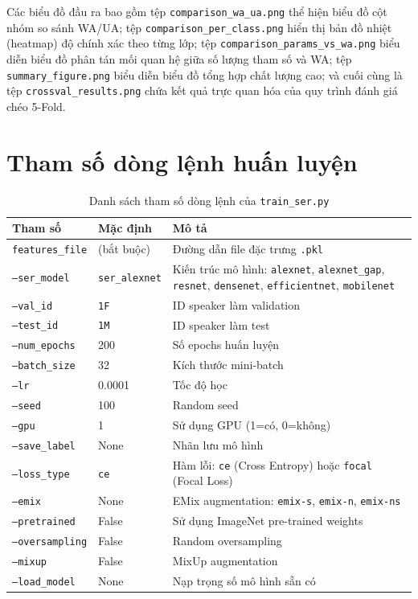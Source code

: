 Các biểu đồ đầu ra bao gồm tệp \texttt{comparison\_wa\_ua.png} thể hiện biểu đồ cột nhóm so sánh WA/UA; tệp \texttt{comparison\_per\_class.png} hiển thị bản đồ nhiệt (heatmap) độ chính xác theo từng lớp; tệp \texttt{comparison\_params\_vs\_wa.png} biểu diễn biểu đồ phân tán mối quan hệ giữa số lượng tham số và WA; tệp \texttt{summary\_figure.png} biểu diễn biểu đồ tổng hợp chất lượng cao; và cuối cùng là tệp \texttt{crossval\_results.png} chứa kết quả trực quan hóa của quy trình đánh giá chéo 5-Fold.


\section{Tham số dòng lệnh huấn luyện}
\label{sec:cli_params}

\begin{table}[H]
\centering
\caption{Danh sách tham số dòng lệnh của \texttt{train\_ser.py}}
\label{tab:cli_params}
\begin{tabularx}{\textwidth}{p{3.5cm}p{3.2cm}X}
\toprule
\textbf{Tham số} & \textbf{Mặc định} & \textbf{Mô tả} \\
\midrule
\texttt{features\_file} & (bắt buộc) & Đường dẫn file đặc trưng \texttt{.pkl} \\
\texttt{--ser\_model} & \texttt{ser\_alexnet} & Kiến trúc mô hình: \texttt{alexnet}, \texttt{alexnet\_gap}, \texttt{resnet}, \texttt{densenet}, \texttt{efficientnet}, \texttt{mobilenet} \\
\texttt{--val\_id} & \texttt{1F} & ID speaker làm validation \\
\texttt{--test\_id} & \texttt{1M} & ID speaker làm test \\
\texttt{--num\_epochs} & 200 & Số epochs huấn luyện \\
\texttt{--batch\_size} & 32 & Kích thước mini-batch \\
\texttt{--lr} & 0.0001 & Tốc độ học \\
\texttt{--seed} & 100 & Random seed \\
\texttt{--gpu} & 1 & Sử dụng GPU (1=có, 0=không) \\
\texttt{--save\_label} & None & Nhãn lưu mô hình \\
\texttt{--loss\_type} & \texttt{ce} & Hàm lỗi: \texttt{ce} (Cross Entropy) hoặc \texttt{focal} (Focal Loss) \\
\texttt{--emix} & None & EMix augmentation: \texttt{emix-s}, \texttt{emix-n}, \texttt{emix-ns} \\
\texttt{--pretrained} & False & Sử dụng ImageNet pre-trained weights \\
\texttt{--oversampling} & False & Random oversampling \\
\texttt{--mixup} & False & MixUp augmentation \\
\texttt{--load\_model} & None & Nạp trọng số mô hình sẵn có \\
\bottomrule
\end{tabularx}
\end{table}


